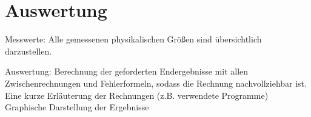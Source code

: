 \section{Auswertung}
\label{sec:Auswertung}

Messwerte: Alle gemessenen physikalischen Größen sind übersichtlich darzustellen.

Auswertung:
Berechnung der geforderten Endergebnisse
mit allen Zwischenrechnungen und Fehlerformeln, sodass die Rechnung nachvollziehbar ist.
Eine kurze Erläuterung der Rechnungen (z.B. verwendete Programme)
Graphische Darstellung der Ergebnisse